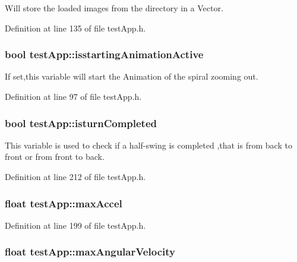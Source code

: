 Will store the loaded images from the directory in a Vector. 



Definition at line 135 of file test\-App.\-h.

\hypertarget{classtest_app_ab8a277e1055730fb5d6786ce0c4804b2}{
\subsubsection[{isstarting\-Animation\-Active}]{\setlength{\rightskip}{0pt plus 5cm}bool test\-App\-::isstarting\-Animation\-Active}}\label{classtest_app_ab8a277e1055730fb5d6786ce0c4804b2}


If set,this variable will start the Animation of the spiral zooming out. 



Definition at line 97 of file test\-App.\-h.

\hypertarget{classtest_app_a42478a80a90ce9f663c04bcdaea5c5bd}{
\subsubsection[{isturn\-Completed}]{\setlength{\rightskip}{0pt plus 5cm}bool test\-App\-::isturn\-Completed}}\label{classtest_app_a42478a80a90ce9f663c04bcdaea5c5bd}


This variable is used to check if a half-\/swing is completed ,that is from back to front or from front to back. 



Definition at line 212 of file test\-App.\-h.

\hypertarget{classtest_app_a34e834a5e4d359700147a74eece8eed1}{
\subsubsection[{max\-Accel}]{\setlength{\rightskip}{0pt plus 5cm}float test\-App\-::max\-Accel}}\label{classtest_app_a34e834a5e4d359700147a74eece8eed1}


Definition at line 199 of file test\-App.\-h.

\hypertarget{classtest_app_ab9565e8e6dc748ef68e6845f5f94cae9}{
\subsubsection[{max\-Angular\-Velocity}]{\setlength{\rightskip}{0pt plus 5cm}float test\-App\-::max\-Angular\-Velocity}}\label{classtest_app_ab9565e8e6dc748ef68e6845f5f94cae9}


